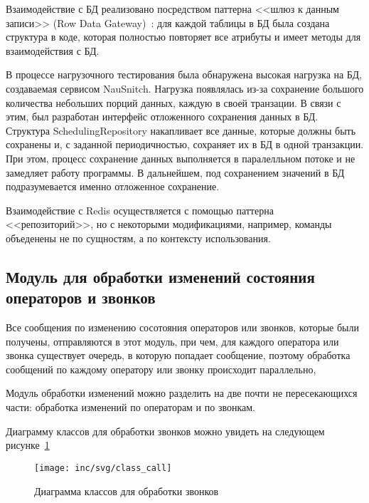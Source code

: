 Взаимодействие с БД реализовано посредством паттерна <<шлюз к данным записи>> (Row Data Gateway)~\cite{fauler2019}:
для каждой таблицы в БД %
была создана структура в коде, которая полностью повторяет все атрибуты
и имеет методы для взаимодействия с БД.

В процессе нагрузочного тестирования была обнаружена высокая нагрузка
на БД, создаваемая сервисом NauSnitch.
Нагрузка появлялась из-за сохранение большого количества
небольших порций данных, каждую в своей транзации.
В связи с этим, был разработан интерфейс отложенного сохранения данных в БД.
Структура SchedulingRepository накапливает все данные, которые должны быть сохранены и,
с заданной периодичностью, сохраняет их в БД в одной транзакции.
При этом, процесс сохранение данных выполняется в паралелльном потоке и не замедляет работу программы.
В дальнейшем, под сохранением значений в БД подразумевается именно отложенное сохранение.


Взаимодействие с Redis осуществляется с помощью паттерна <<репозиторий>>, %
но с некоторыми модификациями, например, команды объеденены не по сущностям, а по контексту использования. %

\subsection{Модуль для обработки изменений состояния операторов и звонков}

Все сообщения по изменению сосотояния операторов или звонков, которые были получены,
отправляются в этот модуль, при чем,
для каждого оператора или звонка существует очередь, в которую попадает сообщение,
поэтому обработка сообщений по каждому оператору или звонку происходит параллельно, %

Модуль обработки изменений можно разделить на две почти не пересекающихся части: обработка изменений по операторам и по звонкам.

Диаграмму классов для обработки звонков можно увидеть на следующем рисунке~\ref{pic:call:uml-class}

\begin{figure}[ht]
    \centering
    \texttt{[image: inc/svg/class\_call]}
    \caption{Диаграмма классов для обработки звонков}
    \label{pic:call:uml-class}
\end{figure}

